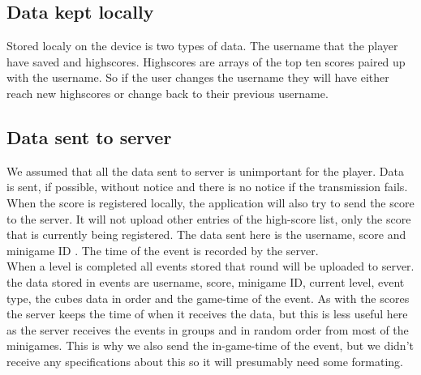 \subsection{Data kept locally}
Stored localy on the device is two types of data.
The username that the player have saved and highscores.
Highscores are arrays of the top ten scores paired up with the username.
So if the user changes the username they will have either reach new highscores
or change back to their previous username.

\subsection{Data sent to server}
We assumed that all the data sent to server is unimportant for the player. Data is sent, if possible, without notice and there is no notice if the transmission fails.
When the score is registered locally, the application will also try to send the score to the server. It will not upload other entries of the high-score list, only the score that is currently being registered. The data sent here is the username, score and minigame ID . The time of the event is recorded by the server. \\
When a level is completed all events stored that round will be uploaded to server. the data stored in events are username, score, minigame ID, current level, event type, the cubes data in order and the game-time of the event. As with the scores the server keeps the time of when it receives the data, but this is less useful here as the server receives the events in groups and in random order from most of the minigames. This is why we also send the in-game-time of the event, but we didn't receive any specifications about this so it will presumably need some formating. 